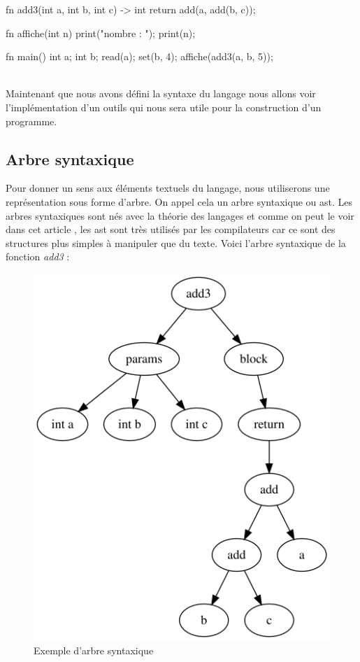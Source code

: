 \documentclass[a4paper]{article}%
\begin{document}
\begin{grammar}[language=C++]
fn add3(int a, int b, int c) -> int {
    return add(a, add(b, c));
}

fn affiche(int n) {
    print("nombre : ");
    print(n);
}

fn main() {
    int a;
    int b;
    read(a);
    set(b, 4);
    affiche(add3(a, b, 5));
}
\end{grammar}\leavevmode\newline
~\\

Maintenant que nous avons défini la syntaxe du langage nous allons voir
l'implémentation d'un outils qui nous sera utile pour la construction d'un
programme.


\clearpage{}

\subsection{Arbre syntaxique}

Pour donner un sens aux éléments textuels du langage, nous utiliserons une
représentation sous forme d'arbre. On appel cela un arbre syntaxique ou
\gls{ast}. Les arbres syntaxiques sont nés avec la
théorie des langages et comme on peut le voir dans cet article
\cite{compilerTICH}, les \gls{ast} sont très utilisés par les compilateurs car ce sont
des structures plus simples à manipuler que du texte. Voici l'arbre syntaxique
de la fonction \textit{add3} :

\begin{figure}[h]
  \begin{center}
  \includegraphics[scale=0.4]{img/ast1.png}
  \caption{Exemple d'arbre syntaxique}
  \end{center}
\end{figure}
\end{document}
